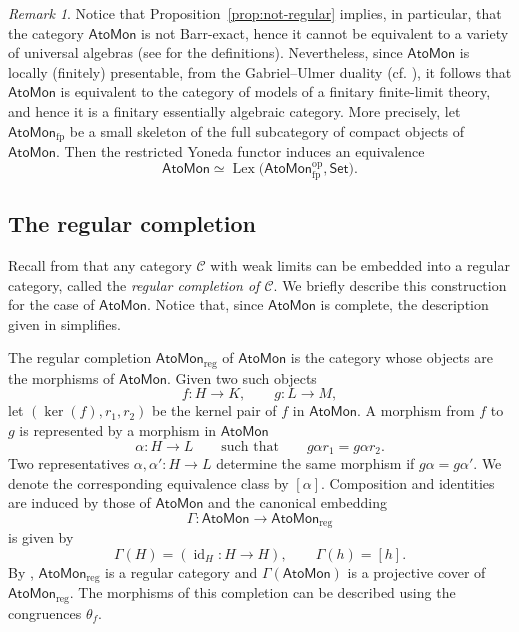 \documentclass[a4paper,10pt,reqno]{amsart}
\theoremstyle{definition}
\theoremstyle{remark}
\newtheorem{remark}[theorem]{Remark}
\newcommand{\AtoMon}{\mathsf{AtoMon}}
\newcommand{\Set}{\mathsf{Set}}
\newcommand{\Cal}[1]{\mathcal{#1}}
\begin{document}
\begin{remark}
Notice that Proposition~\ref{prop:not-regular} implies, in particular, that the category $\AtoMon$ is not Barr-exact, hence it cannot be equivalent to a variety of universal algebras (see \cite{AR,Borceux} for the definitions).
Nevertheless, since $\AtoMon$ is locally (finitely) presentable, from the Gabriel--Ulmer duality (cf. \cite[Chapter~5]{AR}), it follows that $\AtoMon$ is equivalent to the category of models of a finitary finite-limit theory, and hence it is a finitary essentially algebraic category. More precisely, let $\AtoMon_{\mathrm{fp}}$ be a small skeleton of the full subcategory of compact objects of $\AtoMon$. Then the restricted Yoneda functor induces an equivalence
$$
\AtoMon \simeq \operatorname{Lex}\bigl(\AtoMon_{\mathrm{fp}}^{\mathrm{op}},\Set\bigr).
$$
\end{remark}

\subsection{The regular completion}
\label{subsec:regular-completion}

Recall from \cite{CarboniVitale} that any category $\Cal C$ with weak limits can be embedded into a regular category, called the {\em regular completion of $\Cal C$}. We briefly describe this construction for the case of $\AtoMon$. Notice that, since $\AtoMon$ is complete, the description given in \cite[Definition~7]{CarboniVitale} simplifies.

The regular completion $\AtoMon_{\mathrm{reg}}$ of $\AtoMon$ is the category whose objects are the
morphisms of $\AtoMon$. Given two such objects
$$
    f\colon H\to K,
    \qquad
    g\colon L\to M,
$$
let $(\ker(f),r_1,r_2)$ be the kernel pair of $f$ in $\AtoMon$. A morphism from $f$ to $g$
is represented by a morphism in $\AtoMon$
$$
\alpha\colon H\to L \qquad \text{such that}  \qquad g\alpha r_1=g\alpha r_2.
$$
Two representatives $\alpha,\alpha'\colon H\to L$ determine the same
morphism if $g\alpha=g\alpha'$. We denote the corresponding equivalence class by $[\alpha]$. Composition
and identities are induced by those of $\AtoMon$ and the canonical embedding
$$
    \Gamma\colon
    \AtoMon\to \AtoMon_{\mathrm{reg}}
$$
is given by
$$
    \Gamma(H)=(\operatorname{id}_H\colon H\to H),
    \qquad
    \Gamma(h)=[h].
$$
By \cite[Theorem~8, Proposition~9]{CarboniVitale}, $\AtoMon_{\mathrm{reg}}$ is a regular category and $\Gamma(\AtoMon)$ is a projective cover of $\AtoMon_{\mathrm{reg}}$. The morphisms of this completion can be described using the congruences $\theta_f$.
\end{document}

